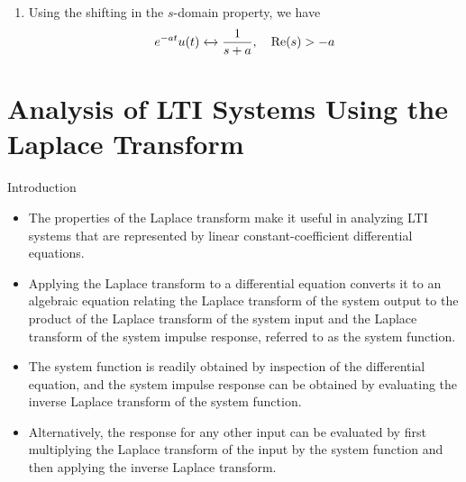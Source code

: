 \begin{frame}[allowframebreaks]{}
{\begin{enumerate}
              \begin{align*}
                tu(t) &\xleftrightarrow{}  -\frac{d}{ds}\left(\frac{1}{s}\right) = \frac{1}{s^2}, \quad \mathrm{Re}(s)>0\\
              \end{align*}
              \pause
          \item Using the shifting in the $s$-domain property, we have
              \begin{align*}
                e^{-at}u(t) &\xleftrightarrow{}  \frac{1}{s+a}, \quad \mathrm{Re}(s)>-a\\
              \end{align*}
        \end{enumerate}

    }
\end{frame}

\section{Analysis of LTI Systems Using the Laplace Transform}

\begin{frame}{Introduction}
    \begin{itemize}
        \item The properties of the Laplace transform make it useful in analyzing LTI systems that are represented by linear constant-coefficient differential equations.
        \item Applying the Laplace transform to a differential equation converts it to an algebraic equation relating the Laplace transform of the system output to the product of the Laplace transform of the system input and the Laplace transform of the system impulse response, referred to as the system function.
        \item The system function is readily obtained by inspection of the differential equation, and the system impulse response can be obtained by evaluating the inverse Laplace transform of the system function.
        \item Alternatively, the response for any other input can be evaluated by first multiplying the Laplace transform of the input by the system function and then applying the inverse Laplace transform.
    \end{itemize}
\end{frame}

